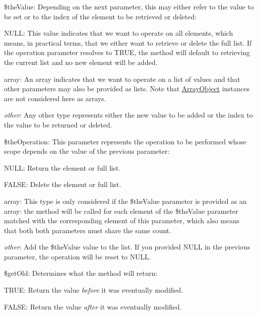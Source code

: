 \begin{DoxyItemize}
\item {\ttfamily \$the\-Value}\-: Depending on the next parameter, this may either refer to the value to be set or to the index of the element to be retrieved or deleted\-: 
\begin{DoxyItemize}
\item {\ttfamily N\-U\-L\-L}\-: This value indicates that we want to operate on all elements, which means, in practical terms, that we either want to retrieve or delete the full list. If the operation parameter resolves to {\ttfamily T\-R\-U\-E}, the method will default to retrieving the current list and no new element will be added. 
\item {\ttfamily array}\-: An array indicates that we want to operate on a list of values and that other parameters may also be provided as lists. Note that \hyperlink{}{Array\-Object} instances are not considered here as arrays. 
\item {\itshape other}\-: Any other type represents either the new value to be added or the index to the value to be returned or deleted. 
\end{DoxyItemize}
\item {\ttfamily \$the\-Operation}\-: This parameter represents the operation to be performed whose scope depends on the value of the previous parameter\-: 
\begin{DoxyItemize}
\item {\ttfamily N\-U\-L\-L}\-: Return the element or full list. 
\item {\ttfamily F\-A\-L\-S\-E}\-: Delete the element or full list. 
\item {\ttfamily array}\-: This type is only considered if the {\ttfamily \$the\-Value} parameter is provided as an array\-: the method will be called for each element of the {\ttfamily \$the\-Value} parameter matched with the corresponding element of this parameter, which also means that both both parameters must share the same count. 
\item {\itshape other}\-: Add the {\ttfamily \$the\-Value} value to the list. If you provided {\ttfamily N\-U\-L\-L} in the previous parameter, the operation will be reset to {\ttfamily N\-U\-L\-L}. 
\end{DoxyItemize}
\item {\ttfamily \$get\-Old}\-: Determines what the method will return\-: 
\begin{DoxyItemize}
\item {\ttfamily T\-R\-U\-E}\-: Return the value {\itshape before} it was eventually modified. 
\item {\ttfamily F\-A\-L\-S\-E}\-: Return the value {\itshape after} it was eventually modified. 
\end{DoxyItemize}
\end{DoxyItemize}


